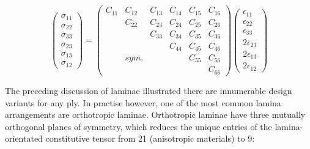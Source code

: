 \begin{equation} 
\begin{pmatrix}
\sigma_{11} \\
\sigma_{22} \\
\sigma_{33} \\
\sigma_{23} \\
\sigma_{13} \\
\sigma_{12}
\end{pmatrix}
=
\begin{pmatrix}
C_{11} & C_{12} & C_{13} & C_{14} & C_{15} & C_{16} \\
\  & C_{22} & C_{23} & C_{24} & C_{25} & C_{26} \\
\  & \  & C_{33} & C_{34} & C_{35} & C_{36} \\
\  & \  & \  & C_{44} & C_{45} & C_{46} \\
\  & sym. & \  & \ & C_{55} & C_{56} \\
\  & \  & \  & \  & \  & C_{66}
\end{pmatrix}
\begin{pmatrix}
\epsilon_{11} \\
\epsilon_{22} \\
\epsilon_{33} \\
2\epsilon_{23} \\
2\epsilon_{13} \\
2\epsilon_{12}
\end{pmatrix}
\label{eqscomp2}
\end{equation}

The preceding discussion of laminae illustrated there are innumerable design variants for any ply. In practise however, one of the most common lamina arrangements are orthotropic laminae. Orthotropic laminae have three mutually orthogonal planes of symmetry, which reduces the unique entries of the lamina-orientated constitutive tensor from 21 (anisotropic materials) to 9:

